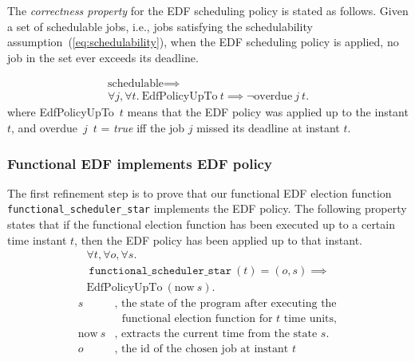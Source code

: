 	The \emph{correctness property} for the EDF scheduling policy is stated as follows.
	Given a set of schedulable jobs, i.e., jobs satisfying the schedulability assumption~(\ref{eq:schedulability}), when the EDF scheduling policy is applied,
	no job in the set ever exceeds its deadline.
	
	\begin{gather*}
  		\text{schedulable} \implies\\
  		\forall j, \forall t. ~\text{EdfPolicyUpTo}~t \implies \neg \text{overdue}~j~t.
	\end{gather*}
	where {EdfPolicyUpTo}~$t$ means that the EDF policy was  applied up to the instant $t$, and
	{overdue}~$j$~$t$ = \emph{true} iff the job $j$ missed its deadline at instant $t$.

	\subsubsection{Functional EDF implements EDF policy}
	\label{sec:functional}
	The first refinement step is to prove that our functional EDF election function \texttt{functional\_scheduler\_star} implements the EDF policy. The following property states that if the functional election function has been executed up to a certain time instant $t$, then the EDF policy has been applied up to that instant.
	\begin{gather*}
		\forall t, \forall o, \forall s.\\ 
		~\texttt{functional\_scheduler\_star}~(t) = (o,s) \implies\\
		\text{EdfPolicyUpTo}~(\text{now}~s).
	\end{gather*}
	\begin{align*}
              s&\text{, the state of the program after executing the}\\
	       &\text{~~functional election function for $t$ time units},\\
              \text{now}~s&\text{, extracts the current time from the state $s$.}\\
	      o~&\text{, the id of the chosen job at instant $t$}
	\end{align*}

